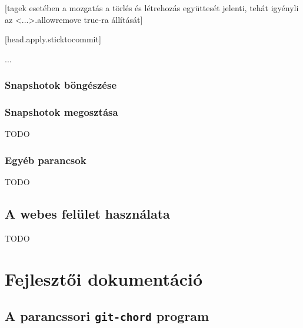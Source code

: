 \documentclass[final]{elteikthesis}[2025/03/25]
\begin{document}
[tagek esetében a mozgatás a törlés és létrehozás együttesét jelenti, tehát igyényli az <...>.allowremove true-ra állítását]

[head.apply.sticktocommit]

...


\subsection{Snapshotok böngészése}



\subsection{Snapshotok megosztása}

TODO


\subsection{Egyéb parancsok}

TODO


\section{A webes felület használata}

TODO

\cleardoublepage

\chapter{Fejlesztői dokumentáció}

\section{A parancssori \texttt{git-chord} program}
\end{document}
